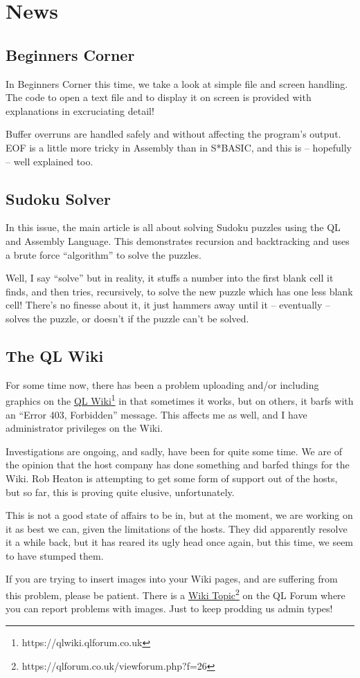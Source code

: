 
\chapter{News}

\section{Beginners Corner}

In Beginners Corner this time, we take a look at simple file and screen
handling. The code to open a text file and to display it on screen
is provided with explanations in excruciating detail!

Buffer overruns are handled safely and without affecting the program's
output. EOF is a little more tricky in Assembly than in S{*}BASIC,
and this is -- hopefully -- well explained too.

\section{Sudoku Solver}

In this issue, the main article is all about solving Sudoku puzzles
using the QL and Assembly Language. This demonstrates recursion and
backtracking and uses a brute force ``algorithm'' to solve the puzzles. 

Well, I say ``solve'' but in reality, it stuffs a number into the
first blank cell it finds, and then tries, recursively, to solve the
new puzzle which has one less blank cell! There's no finesse about
it, it just hammers away until it -- eventually -- solves the puzzle,
or doesn't if the puzzle can't be solved.

\section{The QL Wiki}

For some time now, there has been a problem uploading and/or including
graphics on the \href{https://qlwiki.qlforum.co.uk/}{QL Wiki}\footnote{https://qlwiki.qlforum.co.uk}
in that sometimes it works, but on others, it barfs with an ``Error
403, Forbidden'' message. This affects me as well, and I have administrator
privileges on the Wiki.

Investigations are ongoing, and sadly, have been for quite some time.
We are of the opinion that the host company has done something and
barfed things for the Wiki. Rob Heaton is attempting to get some form
of support out of the hosts, but so far, this is proving quite elusive,
unfortunately.

This is not a good state of affairs to be in, but at the moment, we
are working on it as best we can, given the limitations of the hosts.
They did apparently resolve it a while back, but it has reared its
ugly head once again, but this time, we seem to have stumped them.

If you are trying to insert images into your Wiki pages, and are suffering
from this problem, please be patient. There is a \href{https://qlforum.co.uk/viewforum.php?f=26}{Wiki Topic}\footnote{https://qlforum.co.uk/viewforum.php?f=26}
on the QL Forum where you can report problems with images. Just to
keep prodding us admin types!
